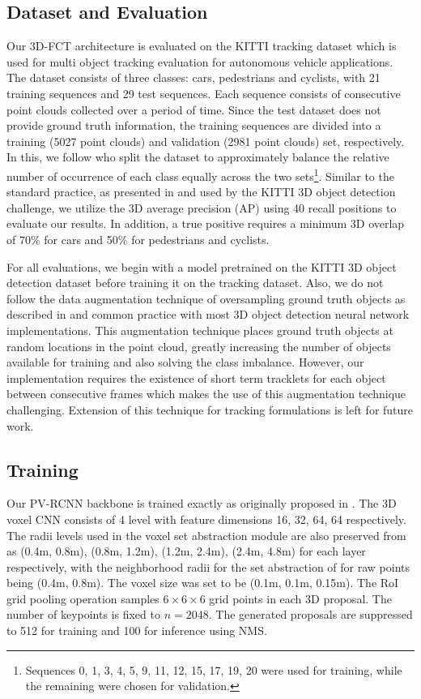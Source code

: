 \documentclass[10pt,twocolumn,letterpaper]{article}
\begin{document}
\subsection{Dataset and Evaluation}
Our 3D-FCT architecture is evaluated on the KITTI \cite{Geiger2013IJRR} tracking dataset which is used for multi object tracking evaluation for autonomous vehicle applications. The dataset consists of three classes: cars, pedestrians and cyclists, with 21 training sequences and 29 test sequences. Each sequence consists of consecutive point clouds collected over a period of time. Since the test dataset does not provide ground truth information, the training sequences are divided into a training (5027 point clouds) and validation (2981 point clouds) set, respectively. In this, we follow \cite{Voigtlaender2019} who split the dataset to approximately balance the relative number of occurrence of each class equally across the two sets\footnote{Sequences 0, 1, 3, 4, 5, 9, 11, 12, 15, 17, 19, 20 were used for training, while the remaining were chosen for validation.}. Similar to the standard practice, as presented in \cite{Simonelli2020} and used by the KITTI 3D object detection challenge, we utilize the 3D average precision (AP) using 40 recall positions to evaluate our results. In addition, a true positive requires a minimum 3D overlap of 70\% for cars and 50\% for pedestrians and cyclists.

For all evaluations, we begin with a model pretrained on the KITTI \cite{Geiger2013IJRR} 3D object detection dataset before training it on the tracking dataset. Also, we do not follow the data augmentation technique of oversampling ground truth objects as described in \cite{Cheng2020,Yan2018} and common practice with most 3D object detection neural network implementations. This augmentation technique places ground truth objects at random locations in the point cloud, greatly increasing the number of objects available for training and also solving the class imbalance. However, our implementation requires the existence of short term tracklets for each object between consecutive frames which makes the use of this augmentation technique challenging. Extension of this technique for tracking formulations is left for future work.

\subsection{Training}
 Our PV-RCNN backbone is trained exactly as originally proposed in \cite{Shi_2020_CVPR}. The 3D voxel CNN consists of 4 level with feature dimensions 16, 32, 64, 64 respectively. The radii levels used in the voxel set abstraction module are also preserved from \cite{Shi_2020_CVPR} as (0.4m, 0.8m), (0.8m, 1.2m), (1.2m, 2.4m), (2.4m, 4.8m) for each layer respectively, with the neighborhood radii for the set abstraction of for raw points being (0.4m, 0.8m). The voxel size was set to be (0.1m, 0.1m, 0.15m). The RoI grid pooling operation samples $6 \times 6 \times 6$ grid points in each 3D proposal. The number of keypoints is fixed to $n=2048$. The generated proposals are suppressed to 512 for training and 100 for inference using NMS.
\end{document}
